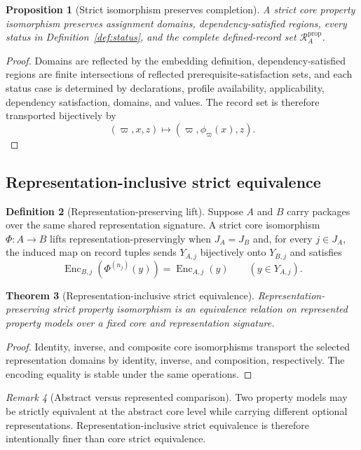 \documentclass[11pt]{article}
\newcommand{\PropRec}{\mathcal R^{\mathrm{prop}}}
\newcommand{\Enc}{\operatorname{Enc}}
\newtheorem{theorem}{Theorem}[section]
\newtheorem{proposition}[theorem]{Proposition}
\theoremstyle{definition}
\newtheorem{definition}[theorem]{Definition}
\theoremstyle{remark}
\newtheorem{remark}[theorem]{Remark}
\begin{document}
\begin{proposition}[Strict isomorphism preserves completion]
A strict core property isomorphism preserves assignment domains, dependency-satisfied regions, every status in Definition~\ref{def:status}, and the complete defined-record set \(\PropRec_A\).
\end{proposition}

\begin{proof}
Domains are reflected by the embedding definition, dependency-satisfied regions are finite intersections of reflected prerequisite-satisfaction sets, and each status case is determined by declarations, profile availability, applicability, dependency satisfaction, domains, and values.
The record set is therefore transported bijectively by
\[
(\varpi,x,z)\longmapsto(\varpi,\phi_{\varpi}(x),z).
\]
\end{proof}

\subsection{Representation-inclusive strict equivalence}

\begin{definition}[Representation-preserving lift]
Suppose \(A\) and \(B\) carry packages over the same shared representation signature.
A strict core isomorphism \(\Phi:A\to B\) lifts representation-preservingly when \(J_A=J_B\) and, for every \(j\in J_A\), the induced map on record tuples sends \(Y_{A,j}\) bijectively onto \(Y_{B,j}\) and satisfies
\[
\Enc_{B,j}(\Phi^{(n_j)}(y))=\Enc_{A,j}(y)
\qquad
(y\in Y_{A,j}).
\]
\end{definition}

\begin{theorem}[Representation-inclusive strict equivalence]
Representation-preserving strict property isomorphism is an equivalence relation on represented property models over a fixed core and representation signature.
\end{theorem}

\begin{proof}
Identity, inverse, and composite core isomorphisms transport the selected representation domains by identity, inverse, and composition, respectively.
The encoding equality is stable under the same operations.
\end{proof}

\begin{remark}[Abstract versus represented comparison]
Two property models may be strictly equivalent at the abstract core level while carrying different optional representations.
Representation-inclusive strict equivalence is therefore intentionally finer than core strict equivalence.
\end{remark}
\end{document}
